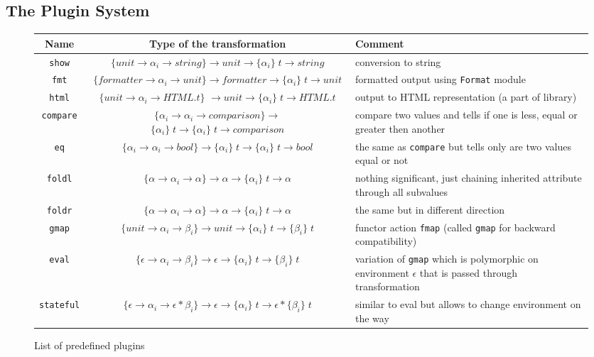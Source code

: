 \subsection{The Plugin System}
\label{plugins}

\begin{figure}[t]
  \center
  \begin{tabular}{ccp{5cm}}
    Name & Type of the transformation & Comment \\
    \hline
    \lstinline|show| & $\{unit \to \alpha_i \to string\}\to unit \to\{\alpha_i\}\;t \to string$ & conversion to string \\
    \lstinline|fmt| & $  \{formatter \to \alpha_i \to unit\}\to formatter \to\{\alpha_i\}\;t \to unit$& formatted output using \lstinline|Format| module \\
    \lstinline|html| & $\{unit \to \alpha_i \to H\!T\!ML.t \}$  $\to unit \to\{\alpha_i\}\;t \to H\!T\!ML.t $& output to HTML representation (a part of library)\\
    \lstinline|compare| & $\{\alpha_i \to \alpha_i \to comparison\} \to$ $\{\alpha_i\}\;t \to\{\alpha_i\}\;t \to comparison$& compare two values and tells if one is less, equal or greater then another\\
    \lstinline|eq| & $\{\alpha_i \to \alpha_i \to bool\}\to \{\alpha_i\}\;t \to\{\alpha_i\}\;t \to bool$ & the same as \lstinline|compare| but tells only are two values equal or not \\
    \lstinline|foldl| & $\{\alpha \to \alpha_i \to \alpha \}\to \alpha \to\{\alpha_i\}\;t \to \alpha $&  nothing significant, just chaining inherited attribute through all subvalues \\
    \lstinline|foldr| & $\{\alpha \to \alpha_i \to \alpha \}\to \alpha \to\{\alpha_i\}\;t \to \alpha $ &  the same but in different direction \\
    \lstinline|gmap| & $\{unit \to \alpha_i \to \beta_i \}\to unit \to \{\alpha_i\}\;t \to \{\beta_i\}\;t $ & functor action \lstinline|fmap| (called \lstinline|gmap| for backward compatibility)\\
    \lstinline|eval| & $\{\epsilon \to \alpha_i \to \beta_i \}\to \epsilon \to \{\alpha_i\}\;t \to \{\beta_i\}\;t $ & variation of \lstinline|gmap| which is polymorphic on environment $\epsilon$ that is passed through transformation\\
    \lstinline|stateful| & $\{\epsilon \to \alpha_i \to \epsilon * \beta_i \}\to \epsilon \to \{\alpha_i\}\;t \to \epsilon * \{\beta_i\}\;t $ & similar to eval but allows to change environment on the way        
  \end{tabular}
  \caption{List of predefined plugins}
  \label{listofplugins}
\end{figure}

